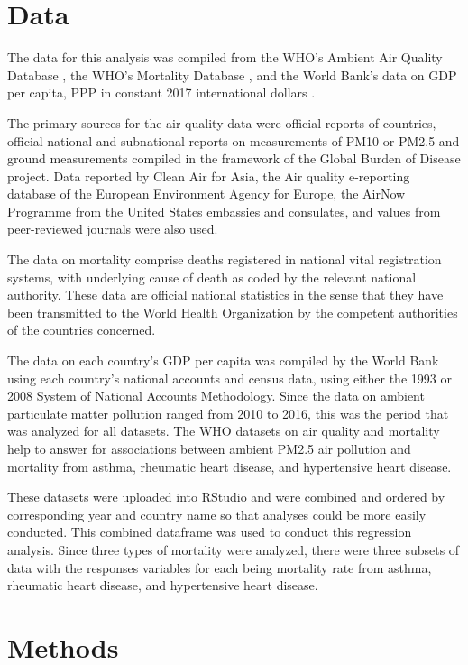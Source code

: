 \documentclass[12pt, letterpaper, twoside]{article}
\begin{document}
\section*{Data}
The data for this analysis was compiled from the WHO's Ambient Air Quality
Database \citep{who2022airquality}, the WHO's Mortality Database
\citep{who2022all}, and the World Bank's data on GDP per capita, PPP
in constant 2017 international dollars \citep{worldbank2022}.\par
The primary sources
for the air quality data were official reports of countries, official national
and subnational reports on measurements of PM10 or PM2.5 and ground measurements
compiled in the framework of the Global Burden of Disease project. Data reported
by Clean Air for Asia, the Air quality e-reporting database of the European
Environment Agency for Europe, the AirNow Programme from the United States
embassies and consulates, and values from peer-reviewed journals were also used.\par
The data on mortality comprise deaths registered in national vital registration
systems, with underlying cause of death as coded by the relevant national
authority. These data are official national statistics in the sense that they
have been transmitted to the World Health Organization by the competent
authorities of the countries concerned.\par
The data on each country's GDP per
capita was compiled by the World Bank using each country's national accounts and
census data, using either the 1993 or 2008 System of National Accounts
Methodology. Since the data on ambient particulate matter pollution ranged from
2010 to 2016, this was the period that was analyzed for all datasets. The WHO
datasets on air quality and mortality help to answer for associations between
ambient PM2.5 air pollution and mortality from asthma, rheumatic heart disease,
and hypertensive heart disease.\par
These datasets were uploaded into RStudio and
were combined and ordered by corresponding year and country name so that analyses
could be more easily conducted. This combined dataframe was used to conduct this
regression analysis. Since three types of mortality were analyzed, there were
three subsets of data with the responses variables for each being mortality
rate from asthma, rheumatic heart disease, and hypertensive heart disease.


\section*{Methods}
\end{document}
